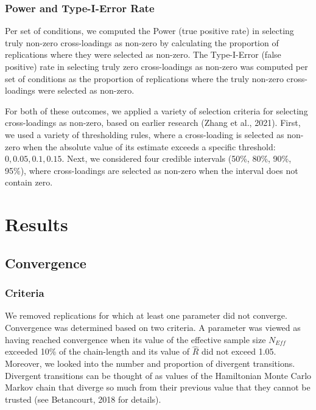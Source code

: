 \documentclass[
  man, donotrepeattitle,floatsintext]{apa6}
\begin{document}
\hypertarget{power-and-type-i-error-rate}{%
\subsubsection{Power and Type-I-Error Rate}\label{power-and-type-i-error-rate}}

Per set of conditions, we computed the Power (true positive rate) in selecting truly non-zero cross-loadings as non-zero by calculating the proportion of replications where they were selected as non-zero. The Type-I-Error (false positive) rate in selecting truly zero cross-loadings as non-zero was computed per set of conditions as the proportion of replications where the truly non-zero cross-loadings were selected as non-zero.

For both of these outcomes, we applied a variety of selection criteria for selecting cross-loadings as non-zero, based on earlier research (Zhang et al., 2021). First, we used a variety of thresholding rules, where a cross-loading is selected as non-zero when the absolute value of its estimate exceeds a specific threshold: \(0, 0.05, 0.1, 0.15\). Next, we considered four credible intervals (50\%, 80\%, 90\%, 95\%), where cross-loadings are selected as non-zero when the interval does not contain zero.

\hypertarget{results}{%
\section{Results}\label{results}}

\hypertarget{convergence}{%
\subsection{Convergence}\label{convergence}}

\hypertarget{criteria}{%
\subsubsection{Criteria}\label{criteria}}

We removed replications for which at least one parameter did not converge. Convergence was determined based on two criteria. A parameter was viewed as having reached convergence when its value of the effective sample size \(N_{Eff}\) exceeded 10\% of the chain-length and its value of \(\hat{R}\) did not exceed 1.05.
Moreover, we looked into the number and proportion of divergent transitions. Divergent transitions can be thought of as values of the Hamiltonian Monte Carlo Markov chain that diverge so much from their previous value that they cannot be trusted (see Betancourt, 2018 for details).
\end{document}
